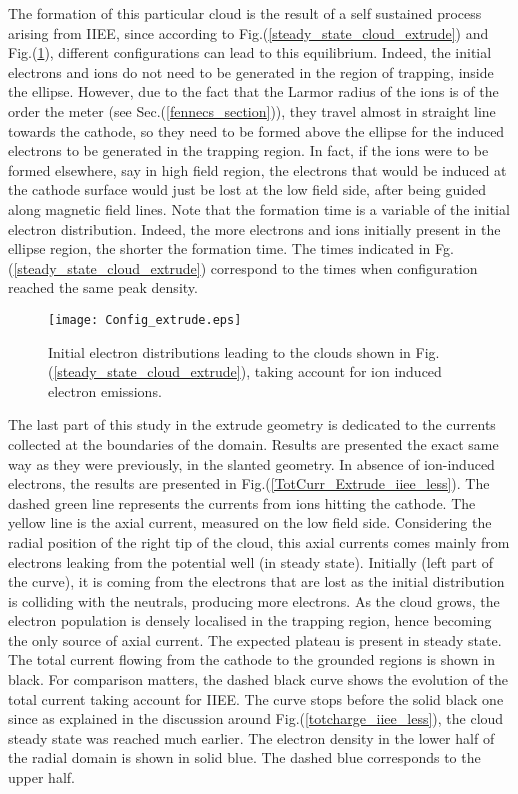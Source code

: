 The formation of this particular cloud is the result of a self sustained process arising from IIEE, since according to Fig.(\ref{steady_state_cloud_extrude}) and Fig.(\ref{Config_extrude}), different configurations can lead to this equilibrium. Indeed, the initial electrons and ions do not need to be generated in the region of trapping, inside the ellipse. However, due to the fact that the Larmor radius of the ions is of the order the meter (see Sec.(\ref{fennecs_section})), they travel almost in straight line towards the cathode, so they need to be formed above the ellipse for the induced electrons to be generated in the trapping region. In fact, if the ions were to be formed elsewhere, say in high field region, the electrons that would be induced at the cathode surface would just be lost at the low field side, after being guided along magnetic field lines. Note that the formation time is a variable of the initial electron distribution. Indeed, the more electrons and ions initially present in the ellipse region, the shorter the formation time. The times indicated in Fg.(\ref{steady_state_cloud_extrude}) correspond to the times when configuration reached the same peak density.\\


\begin{figure}[h!]
\centering
	\texttt{[image: Config\_extrude.eps]}
	\caption{\label{Config_extrude} Initial electron distributions leading to the clouds shown in Fig.(\ref{steady_state_cloud_extrude}), taking account for ion induced electron emissions.}
\end{figure}

The last part of this study in the extrude geometry is dedicated to the currents collected at the boundaries of the domain. Results are presented the exact same way as they were previously, in the slanted geometry. In absence of ion-induced electrons, the results are presented in Fig.(\ref{TotCurr_Extrude_iiee_less}). The dashed green line represents the currents from ions hitting the cathode. The yellow line is the axial current, measured on the low field side. Considering the radial position of the right tip of the cloud, this axial currents comes mainly from electrons leaking from the potential well (in steady state). Initially (left part of the curve), it is coming from the electrons that are lost as the initial distribution is colliding with the neutrals, producing more electrons. As the cloud grows, the electron population is densely localised in the trapping region, hence becoming the only source of axial current. The expected plateau is present in steady state. The total current flowing from the cathode to the grounded regions is shown in black. For comparison matters, the dashed black curve shows the evolution of the total current taking account for IIEE. The curve stops before the solid black one since as explained in the discussion around Fig.(\ref{totcharge_iiee_less}), the cloud steady state was reached much earlier. The electron density in the lower half of the radial domain is shown in solid blue. The dashed blue corresponds to the upper half.\\ 


